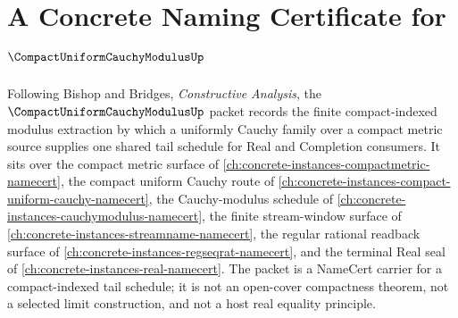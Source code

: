 \chapter{A Concrete Naming Certificate for $\CompactUniformCauchyModulusUp$}
\label{ch:concrete-instances-compact-uniform-cauchy-modulus-namecert}

Following Bishop and Bridges, \emph{Constructive Analysis}, the $\CompactUniformCauchyModulusUp$ packet records the finite compact-indexed modulus extraction by which a uniformly Cauchy family over a compact metric source supplies one shared tail schedule for Real and Completion consumers. It sits over the compact metric surface of \autoref{ch:concrete-instances-compactmetric-namecert}, the compact uniform Cauchy route of \autoref{ch:concrete-instances-compact-uniform-cauchy-namecert}, the Cauchy-modulus schedule of \autoref{ch:concrete-instances-cauchymodulus-namecert}, the finite stream-window surface of \autoref{ch:concrete-instances-streamname-namecert}, the regular rational readback surface of \autoref{ch:concrete-instances-regseqrat-namecert}, and the terminal Real seal of \autoref{ch:concrete-instances-real-namecert}. The packet is a NameCert carrier for a compact-indexed tail schedule; it is not an open-cover compactness theorem, not a selected limit construction, and not a host real equality principle.

